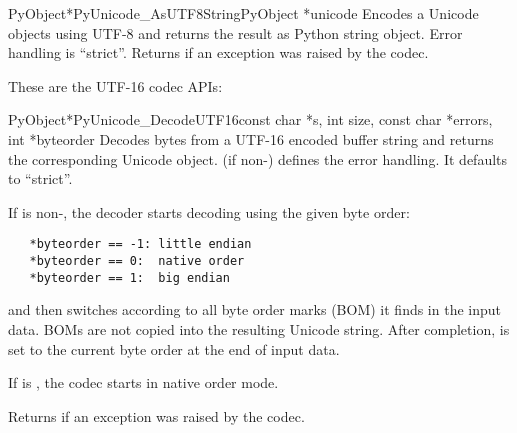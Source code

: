 \begin{cfuncdesc}{PyObject*}{PyUnicode_AsUTF8String}{PyObject *unicode}
  Encodes a Unicode objects using UTF-8 and returns the result as
  Python string object.  Error handling is ``strict''.  Returns
  \NULL{} if an exception was raised by the codec.
\end{cfuncdesc}


These are the UTF-16 codec APIs:

\begin{cfuncdesc}{PyObject*}{PyUnicode_DecodeUTF16}{const char *s,
                                               int size,
                                               const char *errors,
                                               int *byteorder}
  Decodes  bytes from a UTF-16 encoded buffer string and
  returns the corresponding Unicode object.   (if
  non-\NULL{}) defines the error handling. It defaults to ``strict''.

  If  is non-\NULL{}, the decoder starts decoding using
  the given byte order:

\begin{verbatim}
   *byteorder == -1: little endian
   *byteorder == 0:  native order
   *byteorder == 1:  big endian
\end{verbatim}

  and then switches according to all byte order marks (BOM) it finds
  in the input data.  BOMs are not copied into the resulting Unicode
  string.  After completion,  is set to the current
  byte order at the end of input data.

  If  is \NULL{}, the codec starts in native order mode.

  Returns \NULL{} if an exception was raised by the codec.
\end{cfuncdesc}

